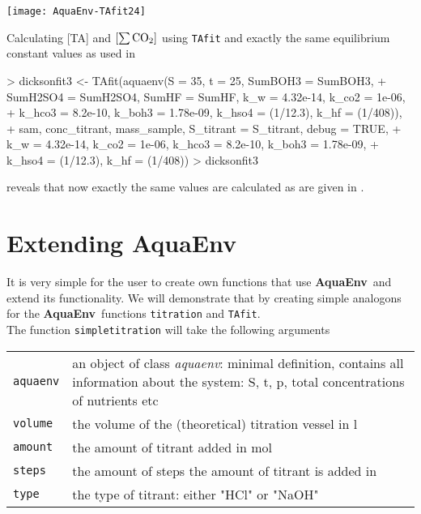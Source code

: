 \documentclass[article,nojss]{jss}
\newcommand{\aq}{\textbf{\textsf{AquaEnv}}}
\begin{document}
\begin{Schunk}
\end{Schunk}
\texttt{[image: AquaEnv-TAfit24]}

Calculating [TA] and $\rm [\sum CO_2]$ using \texttt{TAfit} and exactly the same equilibrium constant values as used in \cite{Dickson1981}
\begin{Schunk}
\begin{Sinput}
> dicksonfit3 <- TAfit(aquaenv(S = 35, t = 25, SumBOH3 = SumBOH3, 
+     SumH2SO4 = SumH2SO4, SumHF = SumHF, k_w = 4.32e-14, k_co2 = 1e-06, 
+     k_hco3 = 8.2e-10, k_boh3 = 1.78e-09, k_hso4 = (1/12.3), k_hf = (1/408)), 
+     sam, conc_titrant, mass_sample, S_titrant = S_titrant, debug = TRUE, 
+     k_w = 4.32e-14, k_co2 = 1e-06, k_hco3 = 8.2e-10, k_boh3 = 1.78e-09, 
+     k_hso4 = (1/12.3), k_hf = (1/408))
> dicksonfit3
\end{Sinput}
\end{Schunk}
reveals that now exactly the same values are calculated as are given in \cite{Dickson1981}.





\section{Extending \aq}

It is very simple for the user to create own functions that use \aq$\,$ and extend its functionality.
We will demonstrate that by creating simple analogons for the \aq$\,$ functions \texttt{titration} and \texttt{TAfit}.\\

\noindent
The function \texttt{simpletitration} will take the following arguments\\
\begin{tabular}{lp{}}
\texttt{aquaenv} & an object of class \textit{aquaenv}: minimal definition, contains all information about the system: S, t, p, total concentrations of nutrients etc \\
\texttt{volume}  & the volume of the (theoretical) titration vessel in l \\
\texttt{amount}  & the amount of titrant added in mol\\
\texttt{steps}   & the amount of steps the amount of titrant is added in \\
\texttt{type}    & the type of titrant: either "HCl" or "NaOH"\\
\end{tabular}
\end{document}
